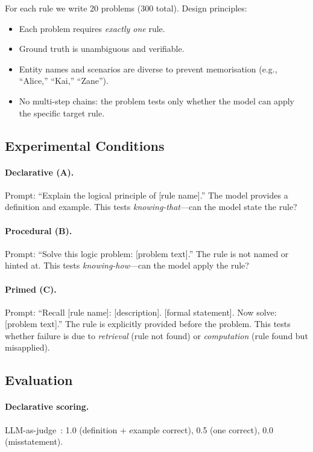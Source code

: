 \documentclass{article}
\begin{document}
For each rule we write 20 problems (300 total).
Design principles:
\begin{itemize}
    \item Each problem requires \emph{exactly one} rule.
    \item Ground truth is unambiguous and verifiable.
    \item Entity names and scenarios are diverse to prevent
    memorisation (e.g., ``Alice,'' ``Kai,'' ``Zane'').
    \item No multi-step chains: the problem tests only whether the
    model can apply the specific target rule.
\end{itemize}

\subsection{Experimental Conditions}

\paragraph{Declarative (A).}
Prompt: ``Explain the logical principle of [rule name].''
The model provides a definition and example.
This tests \emph{knowing-that}---can the model state the rule?

\paragraph{Procedural (B).}
Prompt: ``Solve this logic problem: [problem text].''
The rule is not named or hinted at.
This tests \emph{knowing-how}---can the model apply the rule?

\paragraph{Primed (C).}
Prompt: ``Recall [rule name]: [description]. [formal statement].
Now solve: [problem text].''
The rule is explicitly provided before the problem.
This tests whether failure is due to \emph{retrieval} (rule not
found) or \emph{computation} (rule found but misapplied).

\subsection{Evaluation}

\paragraph{Declarative scoring.}
LLM-as-judge~\cite{zheng2024judging}: 1.0 (definition + example
correct), 0.5 (one correct), 0.0 (misstatement).
\end{document}
